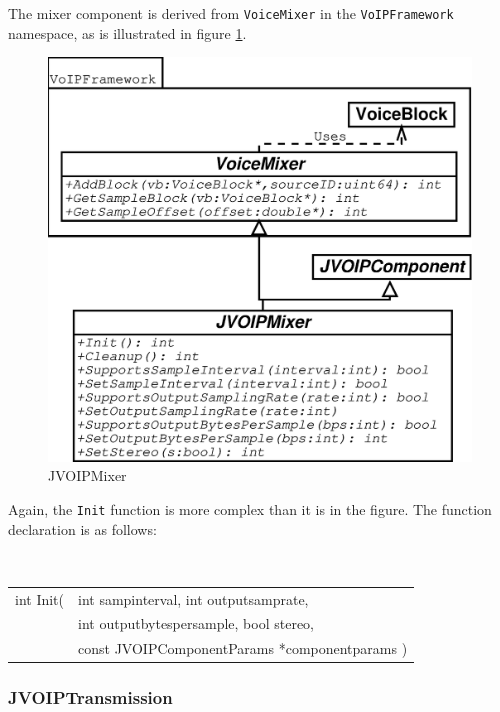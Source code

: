 			The mixer component is derived from {\tt VoiceMixer} in the {\tt VoIPFramework}
			namespace, as is illustrated in figure \ref{class-jvoipmixer}.
			\begin{figure}
				\center
				\includegraphics[width=0.8\linewidth]{images/manual/chapter2/class-jvoipmixer.eps}
				\caption{JVOIPMixer}
				\label{class-jvoipmixer}
			\end{figure}
			
			Again, the {\tt Init} function is more complex than it is in the figure. The
			function declaration is as follows:
			\begin{center}
				{\tt
				\begin{tabular}{rl}
				int Init(&int sampinterval, int outputsamprate,\\
				&int outputbytespersample, bool stereo,\\
				&const JVOIPComponentParams *componentparams )\\
				\end{tabular}
				}
			\end{center}
			
			\subsubsection{JVOIPTransmission}
			
